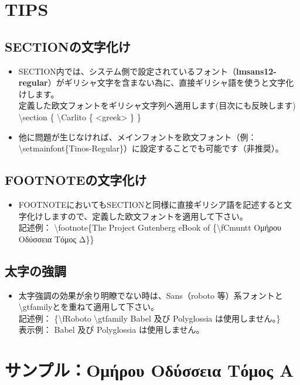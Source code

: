 \documentclass[a4paper,10pt]{ltjsarticle}
\def\colH#1{\color[HTML]{#1}}
\def\bs{\textbackslash }
\begin{document}
\section{TIPS} \vspace{-2mm}
\subsection{SECTIONの文字化け} \vspace{-1mm}  
\begin{itemize}
  \item SECTION内では、システム側で設定されているフォント（\textbf{lmsans12-regular}）がギリシャ文字を含まない為に、直接ギリシャ語を使うと文字化けします。\\
  定義した欧文フォントをギリシャ文字列へ適用します(目次にも反映します)\\
  \bs section \{ {\colH{800000} \bs Carlito \{ <greek> \}} \}
  \item 他に問題が生じなければ、メインフォントを欧文フォント（例：\bs setmainfont\{Tinos-Regular\}）に設定することでも可能です（非推奨）。\vspace{-1mm}
\end{itemize}
\subsection{FOOTNOTEの文字化け} \vspace{-1mm}  
\begin{itemize}
  \item FOOTNOTEにおいてもSECTIONと同様に直接ギリシア語を記述すると文字化けしますので、定義した欧文フォントを適用して下さい。\\
記述例： \bs footnote\{The Project Gutenberg eBook of {\colH{800000}\{\bs fCmuntt} \fCmuntt Ομήρου Οδύσσεια Τόμος Δ{\colH{800000}\}}\}
\end{itemize}

\subsection{太字の強調}  
\begin{itemize}
  \item 太字強調の効果が余り明瞭でない時は、Sans（roboto 等）系フォントと \bs gtfamilyとを重ねて適用して下さい。\\
記述例： \{{\colH{800000}\bs fRoboto \bs gtfamily} Babel 及び Polyglossia は使用しません。\}\\
表示例： {\fRoboto \gtfamily Babel 及び Polyglossia は使用しません。}
\end{itemize}

\section{サンプル：{\fCmuntt Ομήρου Οδύσσεια Τόμος Α}}  
\end{document}
